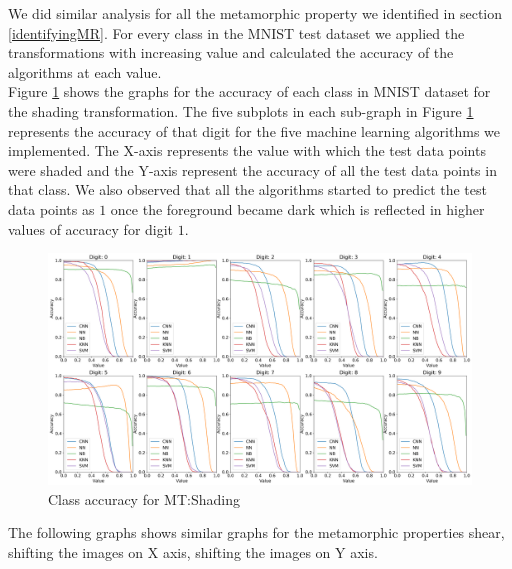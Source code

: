     We did similar analysis for all the metamorphic property we identified in section \ref{identifyingMR}. For every class in the MNIST test dataset we applied the transformations with increasing value and calculated the accuracy of the algorithms at each value.\\
    Figure \ref{fig:Digit by misclassification for Shading MR} shows the graphs for the accuracy of each class in MNIST dataset for the shading transformation. The five subplots in each sub-graph in Figure \ref{fig:Digit by misclassification for Shading MR} represents the accuracy of that digit for the five machine learning algorithms we implemented. The X-axis represents the value with which the test data points were shaded and the Y-axis represent the accuracy of all the test data points in that class. We also observed that all the algorithms started to predict the test data points as $1$ once the foreground became dark which is reflected in higher values of accuracy for digit $1$. \\
        
    \begin{figure}[ht!]
    \centering
        \includegraphics[width=\textwidth]{chapters/results/MT/ShadeAll.png}
        \caption{Class accuracy for MT:Shading}
        \label{fig:Digit by misclassification for Shading MR}
    \end{figure}
    
    The following graphs shows similar graphs for the metamorphic properties shear, shifting the images on X axis, shifting the images on Y axis.
    
